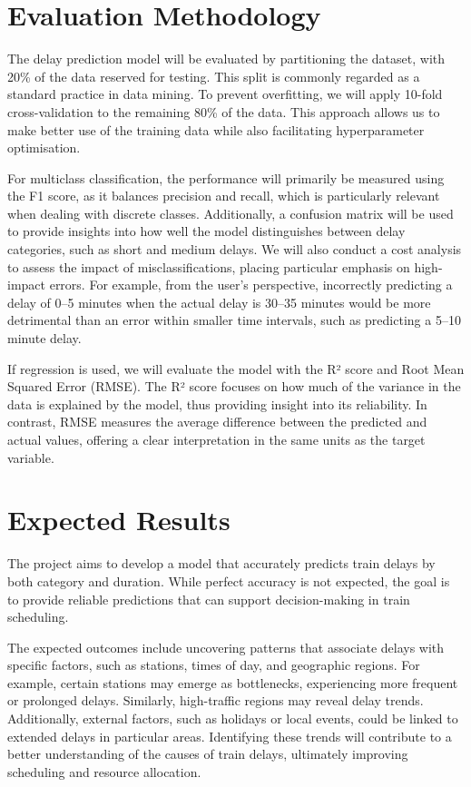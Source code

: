 \documentclass[a4paper,oneside,bibliography=totoc]{scrbook}
\begin{document}
\section{Evaluation Methodology}\label{sec:eval-methodology}
The delay prediction model will be evaluated by partitioning the dataset, with 20\% of the data reserved for testing.
This split is commonly regarded as a standard practice in data mining.
To prevent overfitting, we will apply 10-fold cross-validation to the remaining 80\% of the data.
This approach allows us to make better use of the training data while also facilitating hyperparameter optimisation.

For multiclass classification, the performance will primarily be measured using the F1 score,
as it balances precision and recall, which is particularly relevant when dealing with discrete classes.
Additionally, a confusion matrix will be used to provide insights into how well the model distinguishes between delay categories, such as short and medium delays.
We will also conduct a cost analysis to assess the impact of misclassifications, placing particular emphasis on high-impact errors.
For example, from the user's perspective,
incorrectly predicting a delay of 0–5 minutes when the actual delay is 30–35 minutes would be more detrimental than an error within smaller time intervals,
such as predicting a 5–10 minute delay.

If regression is used, we will evaluate the model with the R² score and Root Mean Squared Error (RMSE).
The R² score focuses on how much of the variance in the data is explained by the model, thus providing insight into its reliability.
In contrast, RMSE measures the average difference between the predicted and actual values,
offering a clear interpretation in the same units as the target variable.

\section{Expected Results}
\label{sec:expected_results}

The project aims to develop a model that accurately predicts train delays by both category and duration.
While perfect accuracy is not expected, the goal is to provide reliable predictions that can support decision-making in train scheduling.

The expected outcomes include uncovering patterns that associate delays with specific factors,
such as stations, times of day, and geographic regions.
For example, certain stations may emerge as bottlenecks, experiencing more frequent or prolonged delays.
Similarly, high-traffic regions may reveal delay trends.
Additionally, external factors, such as holidays or local events, could be linked to extended delays in particular areas.
Identifying these trends will contribute to a better understanding of the causes of train delays, ultimately improving scheduling and resource allocation.
\end{document}
